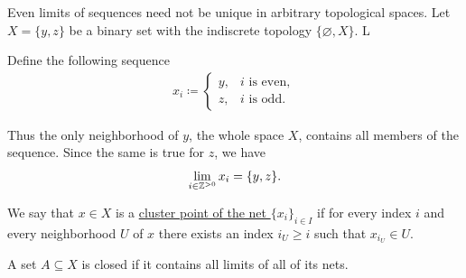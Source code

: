 \begin{example}\label{ex:multiple_limit_points_of_net}
  Even limits of sequences need not be unique in arbitrary topological spaces. Let $X = \{ y, z \}$ be a binary set with the indiscrete topology $\{ \varnothing, X \}$. L

  Define the following sequence
  \begin{align*}
    x_i \coloneqq \begin{cases}
      y, &i \text{ is even}, \\
      z, &i \text{ is odd}.
    \end{cases}
  \end{align*}

  Thus the only neighborhood of $y$, the whole space $X$, contains all members of the sequence. Since the same is true for $z$, we have
  \begin{align*}
    \lim_{i \in \mathbb Z^{>0}} x_i = \{ y, z \}.
  \end{align*}
\end{example}

\begin{definition}\label{def:net_cluster_point}\cite[50]{Engelking1989}
  We say that $x \in X$ is a \ul{cluster point of the net $\{ x_i \}_{i \in I}$} if for every index $i$ and every neighborhood $U$ of $x$ there exists an index $i_U \geq i$ such that $x_{i_U} \in U$.
\end{definition}

\begin{theorem}\label{thm:set_closed_iff_contains_limit_points}\cite[corollary 1.6.4]{Engelking1989}
  A set $A \subseteq X$ is closed if it contains all limits of all of its nets.
\end{theorem}
